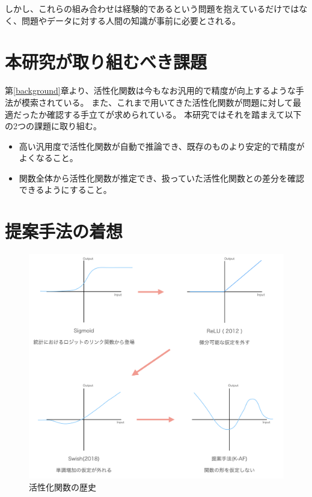 しかし、これらの組み合わせは経験的であるという問題を抱えているだけではなく、問題やデータに対する人間の知識が事前に必要とされる。


\section{本研究が取り組むべき課題}
\label{honkadai}

第\ref{background}章より、活性化関数は今もなお汎用的で精度が向上するような手法が模索されている。
また、これまで用いてきた活性化関数が問題に対して最適だったか確認する手立てが求められている。
本研究ではそれを踏まえて以下の2つの課題に取り組む。

\begin{itemize}
  \item 高い汎用度で活性化関数が自動で推論でき、既存のものより安定的で精度がよくなること。
  \item 関数全体から活性化関数が推定でき、扱っていた活性化関数との差分を確認できるようにすること。
\end{itemize}



\section{提案手法の着想}
\label{history_activation}

\begin{figure}[hbtp]
\includegraphics[width=15cm]{asset/history_af.png}
	\caption{活性化関数の歴史}
	\label{history_af}
\end{figure}


